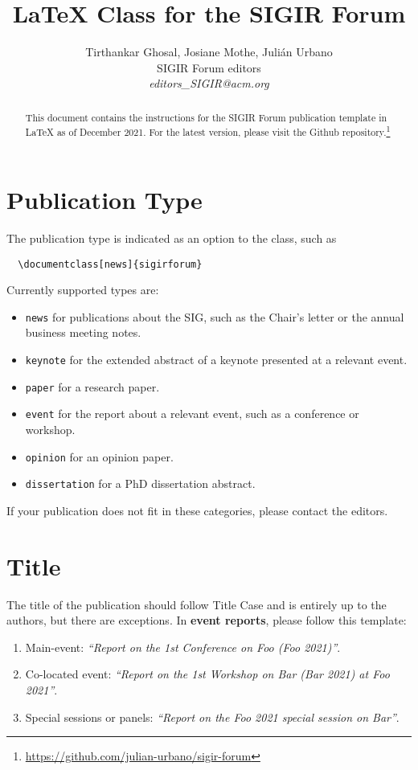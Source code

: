 \documentclass[news]{sigirforum}
\begin{document}
\title{\LaTeX\xspace Class for the SIGIR Forum}

\author{
Tirthankar Ghosal, Josiane Mothe, Juli\'an Urbano\\SIGIR Forum editors\\\emph{editors\_SIGIR@acm.org}}

\maketitle 
\begin{abstract}
This document contains the instructions for the SIGIR Forum publication template in \LaTeX\xspace as of December 2021. For the latest version, please visit the Github repository.\footnote{\url{https://github.com/julian-urbano/sigir-forum}}
\end{abstract}

\section{Publication Type}

The publication type is indicated as an option to the class, such as
\begin{verbatim}
  \documentclass[news]{sigirforum}
\end{verbatim}
Currently supported types are:
\begin{itemize}
	\item \texttt{news} for publications about the SIG, such as the Chair's letter or the annual business meeting notes.
	\item \texttt{keynote} for the extended abstract of a keynote presented at a relevant event.
	\item \texttt{paper} for a research paper.
	\item \texttt{event} for the report about a relevant event, such as a conference or workshop.
	\item \texttt{opinion} for an opinion paper.
	\item \texttt{dissertation} for a PhD dissertation abstract.
\end{itemize}

If your publication does not fit in these categories, please contact the editors.

\section{Title}

The title of the publication should follow Title Case and is entirely up to the authors, but there are exceptions. In \textbf{event reports}, please follow this template:
\begin{enumerate}
	\item Main-event: \textsl{``Report on the 1st Conference on Foo (Foo 2021)''}.
	\item Co-located event: \textsl{``Report on the 1st Workshop on Bar (Bar 2021) at Foo 2021''}.
	\item Special sessions or panels: \textsl{``Report on the Foo 2021 special session on Bar''}.
\end{enumerate}
\end{document}
